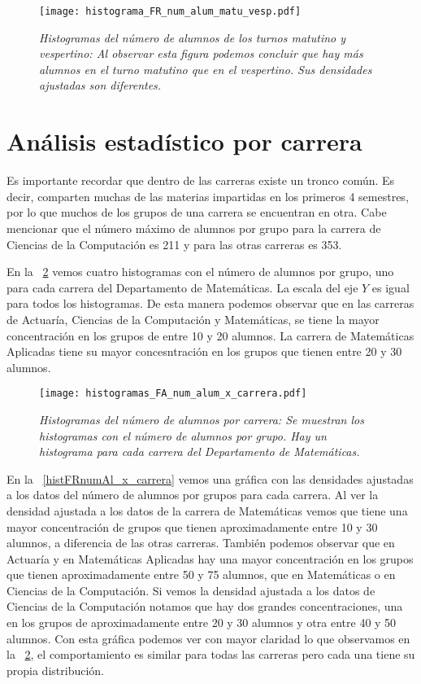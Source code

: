 \begin{figure}[H]
\centering
\texttt{[image: histograma\_FR\_num\_alum\_matu\_vesp.pdf]} %
\caption[\textit{Histogramas del número de alumnos de los turnos matutino y vespertino}]{\textit{Histogramas del número de alumnos de los turnos matutino y vespertino: Al observar esta figura podemos concluir que hay más alumnos en el turno matutino que en el vespertino. Sus densidades ajustadas son diferentes.}}\label{histNumAlTotal_MatuVesp}
\end{figure}


\section{Análisis estadístico por carrera}

Es importante recordar que dentro de las carreras existe un tronco común. Es decir, comparten muchas de las materias impartidas en los primeros 4 semestres, por lo que muchos de los grupos de una carrera se encuentran en otra. Cabe mencionar que el número máximo de alumnos por grupo para la carrera de Ciencias de la Computación es 211 y para las otras carreras es 353.

En la \figurename{~\ref{histFAnumAl_x_carrera}} vemos cuatro histogramas con el número de alumnos por grupo, uno para cada carrera del Departamento de Matemáticas. La escala del eje $Y$ es igual para todos los histogramas. De esta manera podemos observar que en las carreras de Actuaría, Ciencias de la Computación y Matemáticas, se tiene la mayor concentración en los grupos de entre 10 y 20 alumnos. La carrera de Matemáticas Aplicadas tiene su mayor concesntración en los grupos que tienen entre 20 y 30 alumnos.

\begin{figure}[H]
\centering
\texttt{[image: histogramas\_FA\_num\_alum\_x\_carrera.pdf]} %
\caption[\textit{Histogramas del número de alumnos por carrera}]{\textit{Histogramas del número de alumnos por carrera: Se muestran los histogramas con el número de alumnos por grupo. Hay un histograma para cada carrera del Departamento de Matemáticas.}}\label{histFAnumAl_x_carrera}
\end{figure}


En la \figurename{~\ref{histFRnumAl_x_carrera}} vemos una gráfica con las densidades ajustadas a los datos del número de alumnos por grupos para cada carrera. Al ver la densidad ajustada a los datos de la carrera de Matemáticas vemos que tiene una mayor concentración de grupos que tienen aproximadamente entre 10 y 30 alumnos, a diferencia de las otras carreras. También podemos observar que en Actuaría y en Matemáticas Aplicadas hay una mayor concentración en los grupos que tienen aproximadamente entre 50 y 75 alumnos, que en Matemáticas o en Ciencias de la Computación. Si vemos la densidad ajustada a los datos de Ciencias de la Computación notamos que hay dos grandes concentraciones, una en los grupos de aproximadamente entre 20 y 30 alumnos y otra entre 40 y 50 alumnos. Con esta gráfica podemos ver con mayor claridad lo que observamos en la \figurename{~\ref{histFAnumAl_x_carrera}}, el comportamiento es similar para todas las carreras pero cada una tiene su propia distribución.

